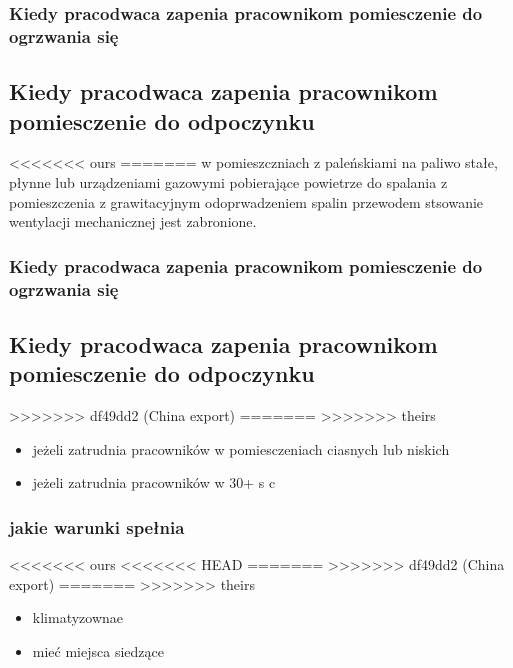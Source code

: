 \documentclass[11pt]{article}
\begin{document}
\begin{enumerate}
\begin{enumerate}
\subsubsection{Kiedy pracodwaca zapenia pracownikom pomiesczenie do ogrzwania się}
\label{sec:org34f5f6f}

\subsection{Kiedy pracodwaca zapenia pracownikom pomiesczenie do odpoczynku}
<<<<<<< ours
\label{sec:orgb5544e3}
=======
\label{sec:orgcb073b6}
w pomieszczniach z paleńskiami na paliwo stałe, płynne lub urządzeniami gazowymi pobierające powietrze do spalania z pomieszczenia z grawitacyjnym odoprwadzeniem spalin przewodem stsowanie wentylacji mechanicznej jest zabronione.
\subsubsection{Kiedy pracodwaca zapenia pracownikom pomiesczenie do ogrzwania się}
\label{sec:org34f5f6f}

\subsection{Kiedy pracodwaca zapenia pracownikom pomiesczenie do odpoczynku}
\label{sec:org6c7e529}
>>>>>>> df49dd2 (China export)
=======
\label{sec:org6c7e529}
>>>>>>> theirs
\begin{itemize}
\item jeżeli zatrudnia pracowników w pomiesczeniach ciasnych lub niskich
\item jeżeli zatrudnia pracowników w 30+ s c
\end{itemize}
\subsubsection{jakie warunki spełnia}
<<<<<<< ours
<<<<<<< HEAD
\label{sec:org40b035c}
=======
\label{sec:org0daa854}
>>>>>>> df49dd2 (China export)
=======
\label{sec:org0daa854}
>>>>>>> theirs
\begin{itemize}
\item klimatyzownae
\item mieć miejsca siedzące
\end{itemize}

\end{enumerate}
\end{enumerate}
\end{document}
